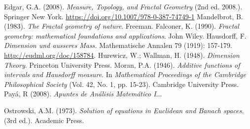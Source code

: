 \begin{thebibliography}{99}
    
 Edgar, G.A. (2008). \textit{Measure, Topology, and Fractal Geometry} (2nd ed. 2008.). Springer New York. \url{https://doi.org/10.1007/978-0-387-74749-1}
 Mandelbrot, B. (1983). \textit{The Fractal geometry of nature}. Freeman.
 Falconer, K. (1990). \textit{Fractal geometry: mathematical foundations and applications}. John Wiley.
 Hausdorff, F. \textit{Dimension und ausseres Mass.} Mathematische Annalen 79 (1919): 157-179. \url{http://eudml.org/doc/158784}.
Hurewicz, W.; Wallman, H. (1948). \textit{Dimension Theory}. Princeton University Press.
Moran, P.A. (1946). \textit{Additive functions of intervals and Hausdorff measure}. In \textit{Mathematical Proceedings of the Cambridge Philosophical Society} (Vol. 42, No. 1, pp. 15-23). Cambridge University Press.
 Payá, R (2008). \textit{Apuntes de Análisis Matemático I}...

 Ostrowski, A.M. (1973). \textit{Solution of equations in Euclidean and Banach spaces.} (3rd ed.). Academic Press.


\end{thebibliography}